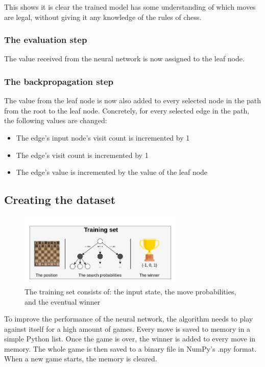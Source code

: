 \documentclass{article}
\begin{document}
This shows it is clear the trained model has some understanding of which moves are legal, 
without giving it any knowledge of the rules of chess. 

\subsubsection{The evaluation step}

The value received from the neural network is now assigned to the leaf node.

\subsubsection{The backpropagation step}

The value from the leaf node is now also added to every selected node in the path from the root to the leaf node.
Concretely, for every selected edge in the path, the following values are changed:

\begin{itemize}
    \item The edge's input node's visit count is incremented by 1
    \item The edge's visit count is incremented by 1
    \item The edge's value is incremented by the value of the leaf node
\end{itemize}


\subsection{Creating the dataset}


\begin{figure}[H]
    \centering
    \includegraphics[width=0.7\textwidth]{img/trainingset.png}
    \caption{The training set consists of: the input state, the move probabilities, and the eventual winner}
\end{figure}

To improve the performance of the neural network, the algorithm needs to play against itself for a high amount of games.
Every move is saved to memory in a simple Python list. Once the game is over, the winner is added to every move in memory.
The whole game is then saved to a binary file in NumPy's .npy format. 
When a new game starts, the memory is cleared.
\end{document}
